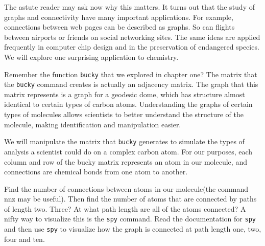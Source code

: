 The astute reader may ask now why this matters. It turns out that the study of graphs and connectivity have many important applications. For example, connections between web pages can be described as graphs. So can flights between airports or friends on social networking sites. The same ideas are applied frequently in computer chip design and in the preservation of endangered species. We will explore one surprising application to chemistry.

Remember the function {\tt bucky} that we explored in chapter one? The matrix that the {\tt bucky} command creates is actually an adjacency matrix. The graph that this matrix represents is a graph for a geodesic dome, which has structure almost identical to certain types of carbon atoms. Understanding the graphs of certain types of molecules allows scientists to better understand the structure of the molecule, making identification and manipulation easier.

We will manipulate the matrix that {\tt bucky} generates to simulate the types of analysis a scientist could do on a complex carbon atom. For our purposes, each column and row of the bucky matrix represents an atom in our molecule, and connections are chemical bonds from one atom to another.

\begin{problem}
Find the number of connections between atoms in our molecule(the command nnz may be useful). Then find the number of atoms that are connected by paths of length two. Three? At what path length are all of the atoms connected?
A nifty way to visualize this is the {\tt spy} command. Read the documentation for {\tt spy} and then use {\tt spy} to visualize how the graph is connected at path length one, two, four and ten.
\end{problem}
